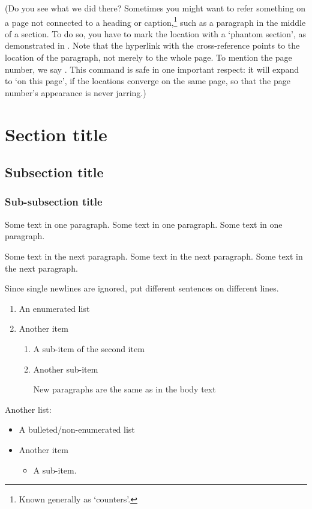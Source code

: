 \documentclass{grattan}
\begin{document}
(Do you see what we did there?
Sometimes you might want to refer something on a page not connected to a heading or caption,\footnote{Known generally as `counters'.} such as a paragraph in the middle of a section.
To do so, you have to mark the location with a `phantom section', as demonstrated in .
Note that the hyperlink with the cross-reference points to the location of the paragraph, not merely to the whole page.
To mention the page number, we say .
This command is safe in one important respect: it will expand to `on this page', if the locations converge on the same page, so that the page number's appearance is never jarring.)

\section{Section title}\label{sec:example}
\subsection{Subsection title}\label{subsec:example}
\subsubsection{Sub-subsection title}\label{subsubsec:example}
Some text in one paragraph. 
Some text in one paragraph. 
Some text in one paragraph. 

Some text in the next paragraph. 
Some text in the next paragraph. 
Some text in the next paragraph. 

Since single newlines are ignored, put different sentences on different lines.

\begin{enumerate}
	\item An enumerated list
	\item Another item
	\begin{enumerate}
		\item A sub-item of the second item
		\item Another sub-item

		New paragraphs are the same as in the body text
	\end{enumerate}
\end{enumerate}

Another list:
\begin{itemize}
	\item A bulleted/non-enumerated list
	\item Another item
	\begin{itemize}
		\item A sub-item.
	\end{itemize}
\end{itemize}
\end{document}
